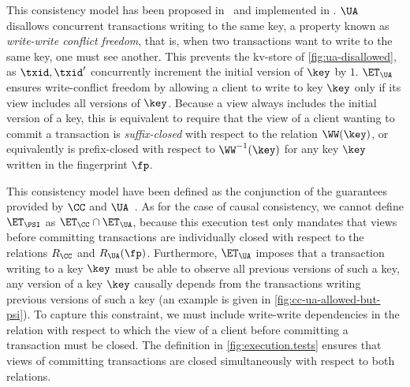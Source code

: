 
This consistency model has been proposed in~\cite{framework-concur} 
and implemented in \cite{rola}.
$\UA$ disallows concurrent transactions writing to the same key,
a property known as \emph{write-write conflict freedom}, that is, 
when two transactions want to write to the same key, one must see another.
This prevents the kv-store of \cref{fig:ua-disallowed},
as $\txid, \txid'$ concurrently increment the initial version of $\key$ by $1$.
$\ET_\UA$ ensures write-conflict freedom by allowing a client to write to key $\key$
only if its view includes all versions of $\key$. Because a view always includes the 
initial version of a key, this is equivalent to require that the view of a client wanting 
to commit a transaction is \emph{suffix-closed} with respect to the relation $\WW(\key)$, 
or equivalently is prefix-closed with respect to $\WW^{-1}(\key)$ for any key $\key$ written in the 
fingerprint $\fp$.

This consistency model have been defined as the conjunction of the guarantees provided by $\CC$ and $\UA$~\cite{framework-concur}. 
As for the case of causal consistency, we cannot define $\ET_{\PSI}$ as $\ET_{\CC} \cap \ET_{\UA}$, because 
this execution test only mandates that views before committing transactions are individually closed with respect to 
the relations $R_{\CC}$ and $R_{\UA}(\fp)$. Furthermore, $\ET_{\UA}$ imposes that a transaction writing 
to a key $\key$ must be able to observe all previous versions of such a key, \ie any version of a key $\key$ 
causally depends from the transactions writing previous versions of such a key (an example is given in \cref{fig:cc-ua-allowed-but-psi}).
To capture this constraint, 
we must include write-write dependencies in the relation with respect to which the view of a client before committing 
a transaction must be closed.
The definition in \cref{fig:execution.tests} ensures that 
views of committing transactions are closed simultaneously with respect to both relations.

